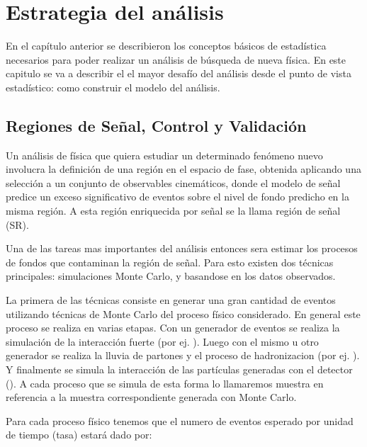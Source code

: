 \chapter{Estrategia del análisis}

En el capítulo anterior se describieron los conceptos básicos de
estadística necesarios para poder realizar un análisis de búsqueda
de nueva física. En este capitulo se va a describir el el mayor
desafío del análisis desde el punto de vista estadístico: como
construir el modelo del análisis.


\section{Regiones de Señal, Control y Validación}
Un análisis de física que quiera estudiar un determinado fenómeno nuevo involucra
la definición de una región en el espacio de fase, obtenida aplicando una selección
a un conjunto de observables cinemáticos, donde el modelo de señal predice un exceso
significativo de eventos sobre el nivel de fondo predicho en la misma región. A esta
región enriquecida por señal se la llama región de señal (SR).

Una de las tareas mas importantes del análisis entonces sera estimar los procesos
de fondos que contaminan la región de señal. Para esto existen dos técnicas principales:
simulaciones Monte Carlo, y basandose en los datos observados.

La primera de las técnicas consiste en generar una gran cantidad de eventos utilizando técnicas
de Monte Carlo del proceso físico considerado. En general este proceso se realiza en varias etapas.
Con un generador de eventos se realiza la simulación de la interacción fuerte (por ej.
{\madgraph}). Luego con el mismo u otro generador se realiza la lluvia de partones y el
proceso de hadronizacion (por ej. {\pythia}). Y finalmente se simula la interacción de las
partículas generadas con el detector ({\geant}). A cada proceso que se simula de esta forma
lo llamaremos muestra en referencia a la muestra correspondiente generada con Monte Carlo.

Para cada proceso físico tenemos que el numero de eventos esperado por unidad de tiempo (tasa)
estará dado por:

